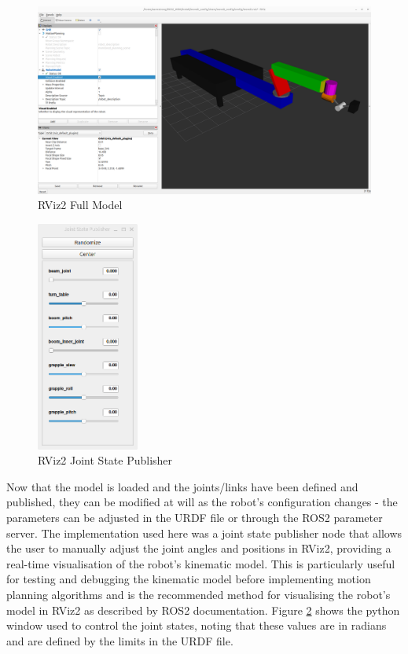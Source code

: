 \documentclass[10pt,a4paper,english]{article}
\begin{document}
\begin{figure}[ht]
    \centering
    \includegraphics[width=1.0\textwidth]{Full_Model.png}
    \caption{RViz2 Full Model}
    \label{fig:rviz2_full_model}
\end{figure}
\newpage

\begin{figure}
    \centering
    \includegraphics[width=0.3\textwidth]{Joint_State_Publisher.png}
    \caption{RViz2 Joint State Publisher}
    \label{fig:rviz2_joint_state_publisher}
\end{figure}

Now that the model is loaded and the joints/links have been defined and published, they can be modified at will as the robot's configuration changes - the parameters can be adjusted in the URDF file or through the ROS2 parameter server. The implementation used here was a joint state publisher node that allows the user to manually adjust the joint angles and positions in RViz2, providing a real-time visualisation of the robot's kinematic model. This is particularly useful for testing and debugging the kinematic model before implementing motion planning algorithms and is the recommended method for visualising the robot's model in RViz2 as described by ROS2 documentation. Figure \ref{fig:rviz2_joint_state_publisher} shows the python window used to control the joint states, noting that these values are in radians and are defined by the limits in the URDF file.
\clearpage
\end{document}
